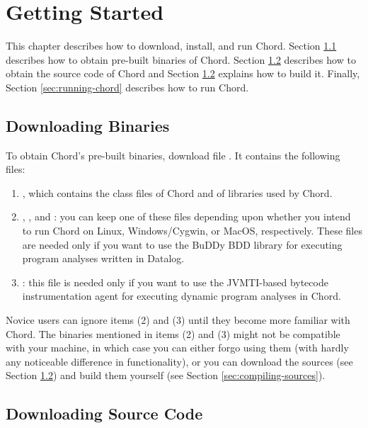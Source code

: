\chapter{Getting Started}
\label{chap:getting-started}

This chapter describes how to download, install, and run Chord.
Section \ref{sec:downloading-binaries} describes how to obtain pre-built binaries of Chord.
Section \ref{sec:downloading-sources} describes how to obtain the source code of Chord
and Section \ref{sec:downloading-sources} explains how to build it.
Finally, Section \ref{sec:running-chord} describes how to run Chord.

\section{Downloading Binaries}
\label{sec:downloading-binaries}

To obtain Chord's pre-built binaries, download file .
It contains the following files:

\begin{enumerate}
\item
{}, which contains the class files of Chord and of libraries used by Chord.
\item
{}, , and : you can keep one of these files
depending upon whether you intend to run Chord on Linux, Windows/Cygwin, or MacOS, respectively.
These files are needed only if you want to use the BuDDy BDD library for executing program
analyses written in Datalog.
\item
{}: this file is needed only if you want to use the JVMTI-based bytecode
instrumentation agent for executing dynamic program analyses in Chord.
\end{enumerate}

Novice users can ignore items (2) and (3) until they become more familiar with Chord.
The binaries mentioned in items (2) and (3) might not be compatible with your machine, in which case you
can either forgo using them (with hardly any noticeable difference in functionality),
or you can download the sources (see Section \ref{sec:downloading-sources}) and build them yourself
(see Section \ref{sec:compiling-sources}).

\section{Downloading Source Code}
\label{sec:downloading-sources}

